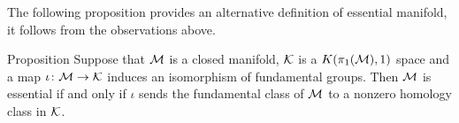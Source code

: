 The following proposition provides an alternative definition of essential manifold, it follows from the observations above.

\begin{thm}{Proposition}
Suppose that $\mathcal{M}$ is a closed manifold, 
$\mathcal{K}$ is a $K(\pi_1(\mathcal{M}),1)$ space and a map $\iota\colon\mathcal{M}\to \mathcal{K}$ induces an isomorphism of fundamental groups.
Then $\mathcal{M}$ is essential if and only if $\iota$ sends the fundamental class of $\mathcal{M}$ to a nonzero homology class in $\mathcal{K}$.
\end{thm}


